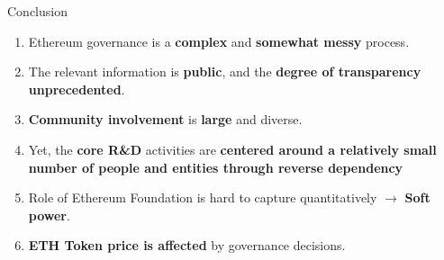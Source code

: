 \documentclass[12pt]{beamer}
\begin{document}
\begin{frame}{Conclusion}
	\begin{enumerate}
		\item Ethereum governance is a \textbf{complex} and \textbf{somewhat messy} process. 
		\item The relevant information is\textbf{ public}, and the \textbf{degree of transparency unprecedented}. 
		\item \textbf{Community involvement} is \textbf{large} and diverse. 
		\item Yet, the \textbf{core R\&D} activities are \textbf{centered around a relatively small number of people and entities through reverse dependency}
		\item Role of Ethereum Foundation is hard to capture quantitatively $\rightarrow$ \textbf{Soft power}.
        \item \textbf{ETH Token price is affected }by governance decisions.
	\end{enumerate}
\end{frame}
\end{document}

